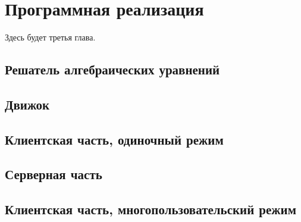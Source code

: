 \chapter{Программная реализация}

Здесь будет третья глава. \TODO

\section{Решатель алгебраических уравнений}

\TODO

\section{Движок}

\TODO

\section{Клиентская часть, одиночный режим}

\TODO

\section{Серверная часть}

\TODO

\section{Клиентская часть, многопользовательский режим}

\TODO
